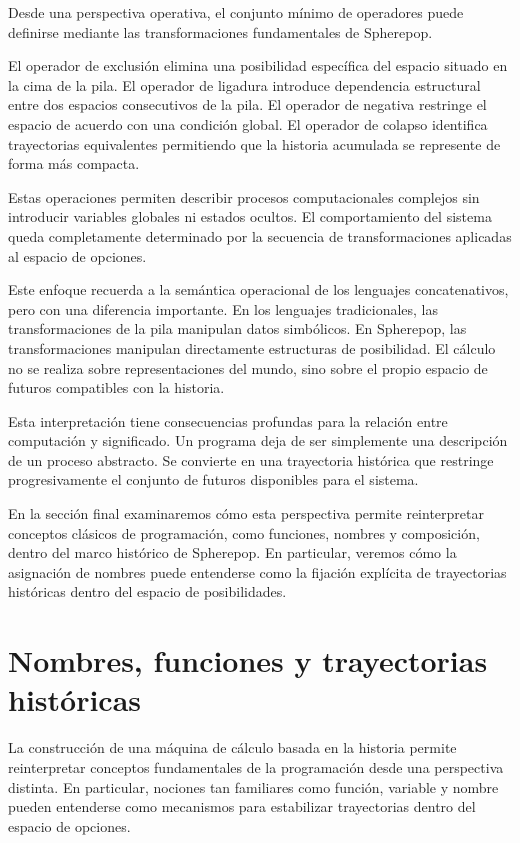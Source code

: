 \documentclass[12pt]{article}
\begin{document}
Desde una perspectiva operativa, el conjunto mínimo de operadores puede definirse mediante las transformaciones fundamentales de Spherepop.

El operador de exclusión elimina una posibilidad específica del espacio situado en la cima de la pila. El operador de ligadura introduce dependencia estructural entre dos espacios consecutivos de la pila. El operador de negativa restringe el espacio de acuerdo con una condición global. El operador de colapso identifica trayectorias equivalentes permitiendo que la historia acumulada se represente de forma más compacta.

Estas operaciones permiten describir procesos computacionales complejos sin introducir variables globales ni estados ocultos. El comportamiento del sistema queda completamente determinado por la secuencia de transformaciones aplicadas al espacio de opciones.

Este enfoque recuerda a la semántica operacional de los lenguajes concatenativos, pero con una diferencia importante. En los lenguajes tradicionales, las transformaciones de la pila manipulan datos simbólicos. En Spherepop, las transformaciones manipulan directamente estructuras de posibilidad. El cálculo no se realiza sobre representaciones del mundo, sino sobre el propio espacio de futuros compatibles con la historia.

Esta interpretación tiene consecuencias profundas para la relación entre computación y significado. Un programa deja de ser simplemente una descripción de un proceso abstracto. Se convierte en una trayectoria histórica que restringe progresivamente el conjunto de futuros disponibles para el sistema.

En la sección final examinaremos cómo esta perspectiva permite reinterpretar conceptos clásicos de programación, como funciones, nombres y composición, dentro del marco histórico de Spherepop. En particular, veremos cómo la asignación de nombres puede entenderse como la fijación explícita de trayectorias históricas dentro del espacio de posibilidades.

\section{Nombres, funciones y trayectorias históricas}

La construcción de una máquina de cálculo basada en la historia permite reinterpretar conceptos fundamentales de la programación desde una perspectiva distinta. En particular, nociones tan familiares como función, variable y nombre pueden entenderse como mecanismos para estabilizar trayectorias dentro del espacio de opciones.
\end{document}
